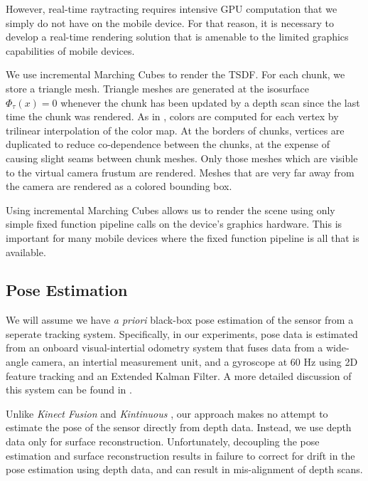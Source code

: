 \documentclass[10pt,twocolumn,letterpaper]{article}
\begin{document}
However, real-time raytracting requires intensive GPU computation that we simply
do not have on the mobile device. For that reason, it is necessary to develop a
real-time rendering solution that is amenable to the limited graphics
capabilities of mobile devices.

We use incremental Marching Cubes \cite{Lorensen1987} to render the TSDF. For
each chunk, we store a triangle mesh. Triangle meshes are generated at the
isosurface $\Phi_{\tau}(x) = 0$ whenever the chunk has been updated by a depth
scan since the last time the chunk was rendered. As in \cite{Bylow2013,
Whelan2013},  colors are computed for each vertex by trilinear interpolation of
the color map. At the borders of chunks, vertices are duplicated to reduce
co-dependence between the chunks, at the expense of causing slight seams
between chunk meshes. Only those meshes which are visible to the virtual camera
frustum are rendered. Meshes that are very far away from the camera are
rendered as a colored bounding box.

Using incremental Marching Cubes allows us to render the scene using only simple
fixed function pipeline calls on the device's graphics hardware. This is
important for many mobile devices where the fixed function pipeline is all that
is available. 

\subsection{Pose Estimation}
We will assume we  have \textit{a priori} black-box pose estimation of
the sensor from a seperate tracking system. Specifically, in our experiments,
pose data is estimated from an onboard visual-intertial odometry system that
fuses data from a wide-angle camera, an intertial measurement unit, and a
gyroscope at 60 Hz using 2D feature tracking and an Extended Kalman Filter. A
more detailed discussion of this system can be found in \cite{VINS}. 

Unlike \textit{Kinect Fusion} \cite{Newcombe} and \textit{Kintinuous}
\cite{Whelan2013}, our approach makes no attempt to estimate the pose of the
sensor directly from depth data. Instead, we use depth data only for surface
reconstruction. Unfortunately, decoupling the pose estimation and surface
reconstruction results in failure to correct for drift in the pose estimation
using depth data, and can result in mis-alignment of depth scans.
\end{document}

